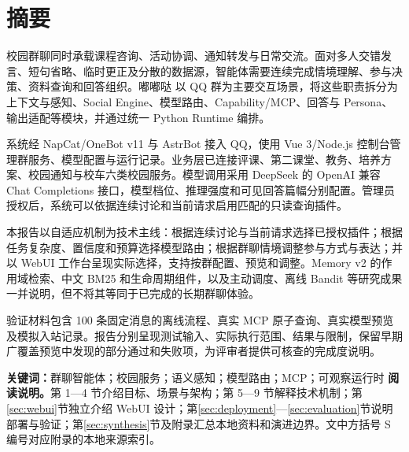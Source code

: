 \documentclass[lang=cn,chinesefont=nofont,11pt,a4paper,bibend=bibtex]{elegantpaper}
\begin{document}
\hypersetup{pageanchor=false}
\hypersetup{pageanchor=true}
\section*{摘要}
{}
校园群聊同时承载课程咨询、活动协调、通知转发与日常交流。面对多人交错发言、短句省略、临时更正及分散的数据源，智能体需要连续完成情境理解、参与决策、资料查询和回答组织。嘟嘟哒 以 QQ 群为主要交互场景，将这些职责拆分为上下文与感知、Social Engine、模型路由、Capability/MCP、回答与 Persona、输出适配等模块，并通过统一 Python Runtime 编排。

系统经 NapCat/OneBot v11 与 AstrBot 接入 QQ，使用 Vue 3/Node.js 控制台管理群服务、模型配置与运行记录。业务层已连接评课、第二课堂、教务、培养方案、校园通知与校车六类校园服务。模型调用采用 DeepSeek 的 OpenAI 兼容 Chat Completions 接口，模型档位、推理强度和可见回答篇幅分别配置。管理员授权后，系统可以依据连续讨论和当前请求启用匹配的只读查询插件。

本报告以自适应机制为技术主线：根据连续讨论与当前请求选择已授权插件；根据任务复杂度、置信度和预算选择模型路由；根据群聊情境调整参与方式与表达；并以 WebUI 工作台呈现实际选择，支持按群配置、预览和调整。Memory v2 的作用域检索、中文 BM25 和生命周期组件，以及主动调度、离线 Bandit 等研究成果一并说明，但不将其等同于已完成的长期群聊体验。

验证材料包含 100 条固定消息的离线流程、真实 MCP 原子查询、真实模型预览及模拟入站记录。报告分别呈现测试输入、实际执行范围、结果与限制，保留早期广覆盖预览中发现的部分通过和失败项，为评审者提供可核查的完成度说明。

\noindent\textbf{关键词：}群聊智能体；校园服务；语义感知；模型路由；MCP；可观察运行时
\vfill
\noindent\textbf{阅读说明。}第 1—4 节介绍目标、场景与架构；第 5—9 节解释技术机制；第\ref{sec:webui}节独立介绍 WebUI 设计；第\ref{sec:deployment}—\ref{sec:evaluation}节说明部署与验证；第\ref{sec:synthesis}节及附录汇总本地资料和演进边界。文中方括号 S 编号对应附录的本地来源索引。
\clearpage
\begingroup\small\linespread{1.05}\selectfont\setlength{\parskip}{0pt}
\tableofcontents
\endgroup\clearpage
{}













\clearpage\appendix

\end{document}
